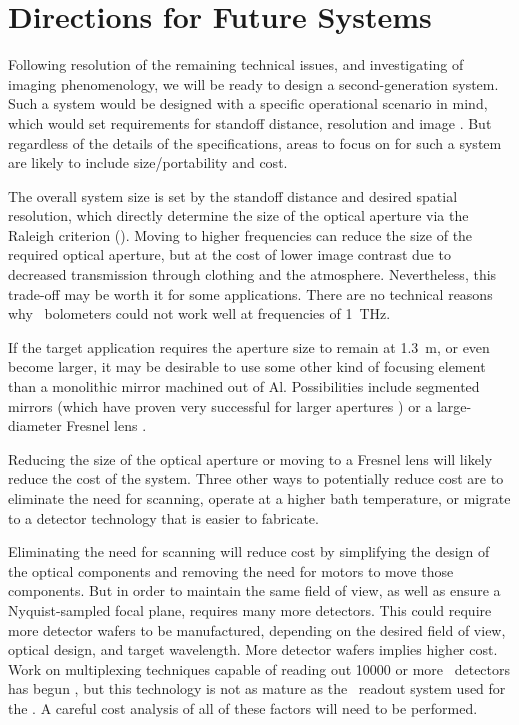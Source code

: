 \section{Directions for Future Systems}

Following resolution of the remaining technical issues, and investigating of imaging phenomenology, we will be ready to design a second-generation system.
Such a system would be designed with a specific operational scenario in mind, which would set requirements for standoff distance, resolution and image \NETD.
But regardless of the details of the specifications, areas to focus on for such a system are likely to include size/portability and cost.

The overall system size is set by the standoff distance and desired spatial resolution, which directly determine the size of the optical aperture via the Raleigh criterion ().
Moving to higher frequencies can reduce the size of the required optical aperture, but at the cost of lower image contrast due to decreased transmission through clothing and the atmosphere.
Nevertheless, this trade-off may be worth it for some applications.
There are no technical reasons why \TES\ bolometers could not work well at frequencies of \SI{1}{\THz}.

If the target application requires the aperture size to remain at \SI{1.3}{\m}, or even become larger, it may be desirable to use some other kind of focusing element than a monolithic mirror machined out of Al.
Possibilities include segmented mirrors (which have proven very successful for larger apertures \cite{fowler_optical_2007}) or a large-diameter Fresnel lens \cite{black_millimeter-wave_1987}.

Reducing the size of the optical aperture or moving to a Fresnel lens will likely reduce the cost of the system.
Three other ways to potentially reduce cost are to eliminate the need for scanning, operate at a higher bath temperature, or migrate to a detector technology that is easier to fabricate.

Eliminating the need for scanning will reduce cost by simplifying the design of the optical components and removing the need for motors to move those components.
But in order to maintain the same field of view, as well as ensure a Nyquist-sampled focal plane, requires many more detectors.
This could require more detector wafers to be manufactured, depending on the desired field of view, optical design, and target wavelength.
More detector wafers implies higher cost.
Work on multiplexing techniques capable of reading out \num{10000} or more \TES\ detectors has begun \cite{irwin_advanced_2012}, but this technology is not as mature as the \TDM\ readout system used for the \Imager.
A careful cost analysis of all of these factors will need to be performed.

